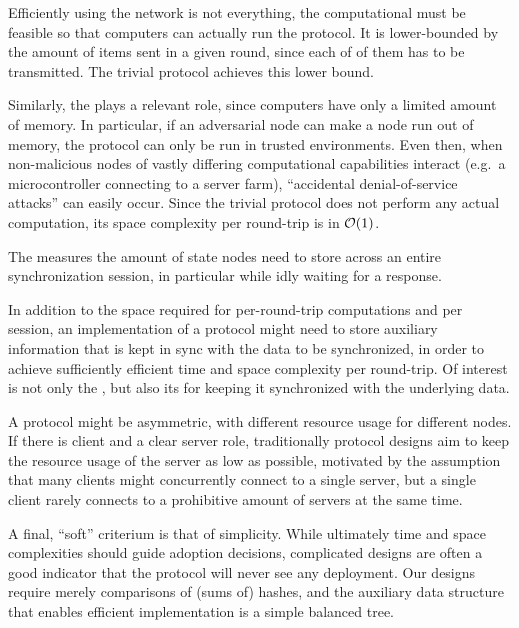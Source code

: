 Efficiently using the network is not everything, the computational
 must be feasible so that
computers can actually run the protocol. It is lower-bounded by the
amount of items sent in a given round, since each of of them has to be transmitted. The trivial protocol achieves this lower bound.

Similarly, the  plays a relevant
role, since computers have only a limited amount of memory. In
particular, if an adversarial node can make a node run out of memory,
the protocol can only be run in trusted environments. Even then, when
non-malicious nodes of vastly differing computational capabilities
interact (e.g.~a microcontroller connecting to a server farm),
``accidental denial-of-service attacks'' can easily occur. Since the
trivial protocol does not perform any actual computation, its space
complexity per round-trip is in $\mathcal{O}(1)$.

The  measures the amount of state
nodes need to store across an entire synchronization session, in particular
while idly waiting for a response.

In addition to the space required for per-round-trip computations and per session, an
implementation of a protocol might need to store auxiliary information
that is kept in sync with the data to be synchronized, in order to
achieve sufficiently efficient time and space complexity per round-trip.
Of interest is not only the , but also its  for keeping it
synchronized with the underlying data.

A protocol might be asymmetric, with different resource usage for different nodes.
If there is client and a clear server role, traditionally protocol designs aim to
keep the resource usage of the server as low as possible, motivated by the assumption
that many clients might concurrently connect to a single server, but a single client rarely
connects to a prohibitive amount of servers at the same time.

A final, ``soft'' criterium is that of simplicity. While ultimately time
and space complexities should guide adoption decisions, complicated
designs are often a good indicator that the protocol will never see any
deployment. Our designs require merely comparisons of (sums of) hashes,
and the auxiliary data structure that enables efficient implementation
is a simple balanced tree.


